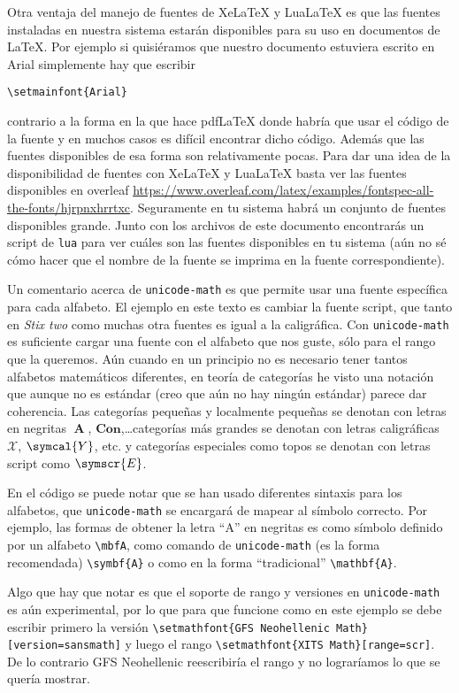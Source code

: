 Otra ventaja del manejo de fuentes de Xe\LaTeX{} y Lua\LaTeX{} es que las
fuentes instaladas en nuestra sistema estarán disponibles para su uso en
documentos de \LaTeX{}. Por ejemplo si quisiéramos que nuestro documento
estuviera escrito en Arial simplemente hay que escribir
\begin{flushleft}
  \verb|\setmainfont{Arial}|
\end{flushleft}
contrario a la forma en la que hace pdf\LaTeX{} donde habría que usar el código
de la fuente y en muchos casos es difícil encontrar dicho código. Además que
las fuentes disponibles de esa forma son relativamente pocas. Para dar una idea
de la disponibilidad de fuentes con Xe\LaTeX{} y Lua\LaTeX{} basta ver las
fuentes disponibles en overleaf \url{https://www.overleaf.com/latex/examples/fontspec-all-the-fonts/hjrpnxhrrtxc}. Seguramente en tu sistema habrá un
conjunto de fuentes disponibles grande. Junto con los archivos de este
documento encontrarás un script de \texttt{lua} para ver cuáles son las fuentes
disponibles en tu sistema (aún no sé cómo hacer que el nombre de la fuente se
imprima en la fuente correspondiente).

Un comentario acerca de \texttt{unicode-math} es que permite usar una
fuente específica para cada alfabeto. El ejemplo en este texto es cambiar la
fuente script, que tanto en \textit{Stix two} como muchas otra fuentes es
igual a la caligráfica. Con \texttt{unicode-math} es suficiente cargar una
fuente con el alfabeto que nos guste, sólo para el rango que la queremos.
Aún cuando en un principio no es necesario tener tantos alfabetos matemáticos
diferentes, en teoría de categorías he visto una notación que aunque no es
estándar (creo que aún no hay ningún estándar) parece dar coherencia. Las
categorías pequeñas y localmente pequeñas se denotan con letras en negritas
\(\mbfA \), \(\symbf{Con}\),\ldots categorías más grandes se denotan con
letras caligráficas \(\mathcal{X}\), \(\symcal{Y}\), etc. y categorías
especiales como topos se denotan con letras script como \(\symscr{E}\).

En el código se puede notar que se han usado diferentes sintaxis para los
alfabetos, que \texttt{unicode-math} se encargará de mapear al símbolo
correcto. Por ejemplo, las formas de obtener la letra ``A'' en negritas es
como símbolo definido por un alfabeto \verb|\mbfA|, como comando de
\texttt{unicode-math} (es la forma recomendada) \verb|\symbf{A}| o como en
la forma ``tradicional'' \verb|\mathbf{A}|.

Algo que hay que notar es que el soporte de rango y versiones en
\texttt{unicode-math} es aún experimental, por lo que para que funcione como
en este ejemplo se debe escribir primero la versión
\verb|\setmathfont{GFS Neohellenic Math}[version=sansmath]|
y luego el rango \verb|\setmathfont{XITS Math}[range=scr]|. De lo contrario
GFS Neohellenic reescribiría el rango y no lograríamos lo que se quería
mostrar.
